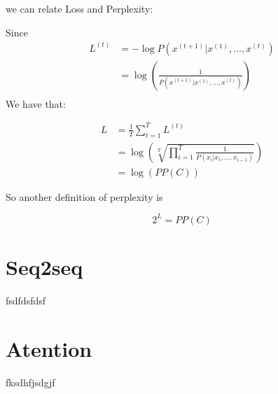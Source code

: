 we can relate Loss and Perplexity:

Since
\begin{align}
L^{(t)} & = - \log P(x^{(t+1)} |x^{(1)}, \dots, x^{(t)})\\
& =  \log(\frac{1}{P(x^{(t+1)}|x^{(1)}, \dots, x^{(t)})})\\
\end{align}
We have that:

\begin{align}
        L &=\frac{1}{T} \sum_{t=1}^{T} L^{(t)}\\
          &= \log\left( \sqrt[T]{\prod_{i=1}^{T}\frac{1}{P(x_i \vert x_1,\dots, x_{i-1})}} \right)\\
          &= \log(PP(C))
\end{align}

So another definition of perplexity is

\begin{equation}
2^{L} = PP(C)
\end{equation}





\section{Seq2seq}
\label{sec:Seq2seq}

fsdfdsfdsf



\section{Atention}
\label{sec:Atention}

fksdhfjsdgjf

